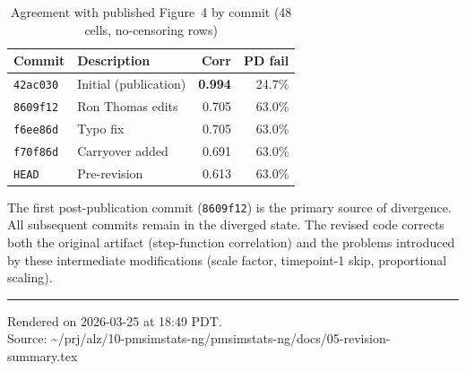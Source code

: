 \documentclass[11pt]{article}
\begin{document}
\begin{table}[h]
\centering
\caption{Agreement with published Figure~4 by commit
  (48 cells, no-censoring rows)}
\begin{tabular}{llrr}
\toprule
Commit & Description & Corr & PD fail \\
\midrule
\texttt{42ac030} & Initial (publication) &
  \textbf{0.994} & 24.7\% \\
\texttt{8609f12} & Ron Thomas edits &
  0.705 & 63.0\% \\
\texttt{f6ee86d} & Typo fix &
  0.705 & 63.0\% \\
\texttt{f70f86d} & Carryover added &
  0.691 & 63.0\% \\
\texttt{HEAD} & Pre-revision &
  0.613 & 63.0\% \\
\bottomrule
\end{tabular}
\end{table}

The first post-publication commit (\texttt{8609f12}) is the
primary source of divergence. All subsequent commits remain
in the diverged state. The revised code corrects both the
original artifact (step-function correlation) and the
problems introduced by these intermediate modifications
(scale factor, timepoint-1 skip, proportional scaling).

\vfill
\noindent\rule{\textwidth}{0.4pt}
{\footnotesize
Rendered on 2026-03-25 at 18:49 PDT.\\
Source: \textasciitilde/prj/alz/10-pmsimstats-ng/pmsimstats-ng/docs/05-revision-summary.tex}
\end{document}
